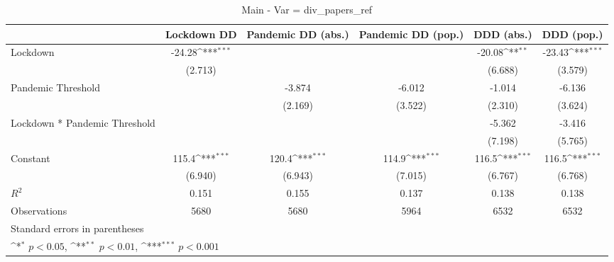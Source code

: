\documentclass{article}
\begin{document}
{
\def\sym#1{\ifmmode^{#1}\else\(^{#1}\)\fi}
\begin{longtable}{l*{5}{c}}
\caption{Main - Var = div\_papers\_ref}\\
\hline\hline\endfirsthead\hline\endhead\hline\endfoot\endlastfoot
                &\multicolumn{1}{c}{Lockdown DD}&\multicolumn{1}{c}{Pandemic DD (abs.)}&\multicolumn{1}{c}{Pandemic DD (pop.)}&\multicolumn{1}{c}{DDD (abs.)}&\multicolumn{1}{c}{DDD (pop.)}\\
\hline
Lockdown        &   -24.28\sym{***}&                  &                  &   -20.08\sym{**} &   -23.43\sym{***}\\
                &  (2.713)         &                  &                  &  (6.688)         &  (3.579)         \\
Pandemic Threshold&                  &   -3.874         &   -6.012         &   -1.014         &   -6.136         \\
                &                  &  (2.169)         &  (3.522)         &  (2.310)         &  (3.624)         \\
Lockdown * Pandemic Threshold&                  &                  &                  &   -5.362         &   -3.416         \\
                &                  &                  &                  &  (7.198)         &  (5.765)         \\
Constant        &    115.4\sym{***}&    120.4\sym{***}&    114.9\sym{***}&    116.5\sym{***}&    116.5\sym{***}\\
                &  (6.940)         &  (6.943)         &  (7.015)         &  (6.767)         &  (6.768)         \\
\hline
\(R^{2}\)       &    0.151         &    0.155         &    0.137         &    0.138         &    0.138         \\
Observations    &     5680         &     5680         &     5964         &     6532         &     6532         \\
\hline\hline
\multicolumn{6}{l}{\footnotesize Standard errors in parentheses}\\
\multicolumn{6}{l}{\footnotesize \sym{*} \(p<0.05\), \sym{**} \(p<0.01\), \sym{***} \(p<0.001\)}\\
\end{longtable}
}
\end{document}
